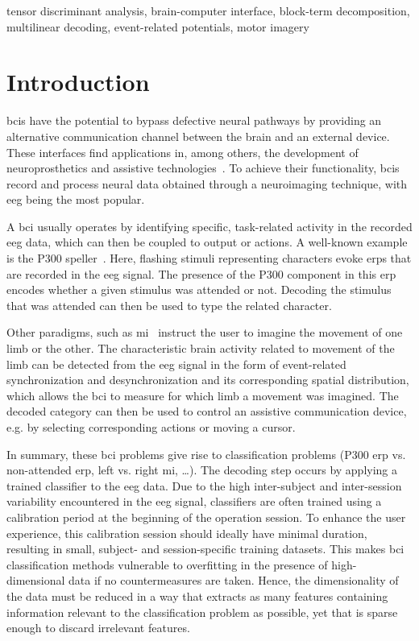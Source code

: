 \documentclass[10pt]{iopart}
\begin{document}
tensor discriminant analysis,
brain-computer interface,
block-term decomposition,
multilinear decoding,
event-related potentials,
motor imagery

\submitto{\JNE}
\maketitle

\ioptwocol

\section{Introduction}

\Acp{bci} have the potential to bypass
defective neural pathways by providing an alternative communication channel
between the brain and an external device.
These interfaces find applications in, among others, the development of neuroprosthetics and assistive
technologies~\cite{Wolpaw2020}.
To achieve their functionality, \acp{bci} record and process neural data obtained through
a neuroimaging technique, with \ac{eeg} being the most popular.

A \ac{bci} usually operates by identifying specific, task-related activity in
the recorded \ac{eeg} data, which can then be coupled to output or actions.
A well-known example is the P300 speller~\cite{Krusienski2006}.
Here, flashing stimuli representing characters evoke \acp{erp} that are recorded in the
\ac{eeg} signal.
The presence of the P300 component in this \ac{erp} encodes whether a given
stimulus was attended or not.
Decoding the stimulus that was attended can then be used to type the related
character.

Other paradigms, such as \ac{mi}~\cite{Aggarwal2019} instruct the user to imagine the movement of
one limb or the other.
The characteristic brain activity related to movement of the limb can be
detected from the \ac{eeg} signal in the form of event-related synchronization
and desynchronization and its corresponding spatial distribution,
which allows the \ac{bci} to measure for which limb a movement was
imagined.
The decoded category can then be used to control an assistive communication
device,
e.g. by selecting corresponding actions or moving a cursor.

In summary, these \ac{bci} problems give rise to classification problems (P300 \ac{erp} vs. non-attended \ac{erp},
left vs. right \ac{mi}, \ldots).
The decoding step occurs by applying a trained classifier to the  \ac{eeg}
data.
Due to the high inter-subject and inter-session variability encountered in
the \ac{eeg} signal, classifiers are often trained using a calibration period
at the beginning of the operation session.
To enhance the user experience, this calibration session should ideally have minimal
duration, resulting in small, subject- and session-specific training datasets.
This makes \ac{bci} classification methods vulnerable to overfitting in the
presence of high-dimensional data if no countermeasures are taken.
Hence, the dimensionality of the data must be reduced in a way that extracts as
many features containing information relevant to the classification problem as
possible, yet that is sparse enough to discard irrelevant features.
\end{document}
